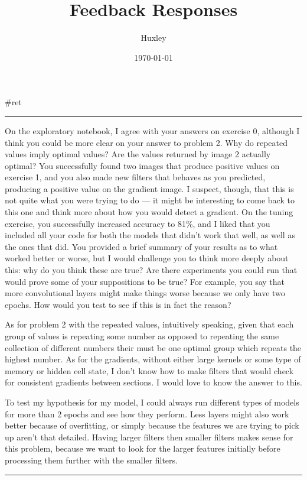 \documentclass[letterpaper]{article}
\author{Huxley}
\date{\today}
\title{Feedback Responses}
\renewcommand\maketitle{}
\begin{document}
\maketitle
\#ret

\noindent\rule{\textwidth}{0.5pt}

On the exploratory notebook, I agree with your answers on exercise 0,
although I think you could be more clear on your answer to problem 2.
Why do repeated values imply optimal values? Are the values returned by
image 2 actually optimal? You successfully found two images that produce
positive values on exercise 1, and you also made new filters that
behaves as you predicted, producing a positive value on the gradient
image. I suspect, though, that this is not quite what you were trying to
do --- it might be interesting to come back to this one and think more
about how you would detect a gradient. On the tuning exercise, you
successfully increased accuracy to 81\%, and I liked that you included
all your code for both the models that didn't work that well, as well as
the ones that did. You provided a brief summary of your results as to
what worked better or worse, but I would challenge you to think more
deeply about this: why do you think these are true? Are there
experiments you could run that would prove some of your suppositions to
be true? For example, you say that more convolutional layers might make
things worse because we only have two epochs. How would you test to see
if this is in fact the reason?

As for problem 2 with the repeated values, intuitively speaking, given
that each group of values is repeating some number as opposed to
repeating the same collection of different numbers their must be one
optimal group which repeats the highest number. As for the gradients,
without either large kernels or some type of memory or hidden cell
state, I don't know how to make filters that would check for consistent
gradients between sections. I would love to know the answer to this.

To test my hypothesis for my model, I could always run different types
of models for more than 2 epochs and see how they perform. Less layers
might also work better because of overfitting, or simply because the
features we are trying to pick up aren't that detailed. Having larger
filters then smaller filters makes sense for this problem, because we
want to look for the larger features initially before processing them
further with the smaller filters.

\noindent\rule{\textwidth}{0.5pt}
\end{document}
